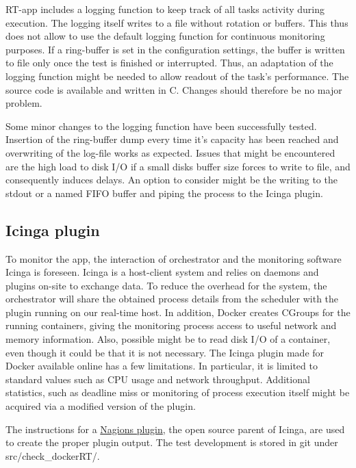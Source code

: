 \documentclass[]{scrartcl}
\begin{document}
RT-app includes a logging function to keep track of all tasks activity during execution. The logging itself writes to a file without rotation or buffers.
This thus does not allow to use the default logging function for continuous monitoring purposes.
If a ring-buffer is set in the configuration settings, the buffer is written to file only once the test is finished or interrupted. 
Thus, an adaptation of the logging function might be needed to allow readout of the task's performance.
The source code is available and written in C. Changes should therefore be no major problem.

Some minor changes to the logging function have been successfully tested. Insertion of the ring-buffer dump every time it's capacity has been reached and overwriting of the log-file works as expected.
Issues that might be encountered are the high load to disk I/O if a small disks buffer size forces to write to file, and consequently induces delays.
%
An option to consider might be the writing to the stdout or a named FIFO buffer and piping the process to the Icinga plugin. 

\subsection{Icinga plugin}

To monitor the app, the interaction of orchestrator and the monitoring software Icinga is foreseen.
Icinga is a host-client system and relies on daemons and plugins on-site to exchange data. 
To reduce the overhead for the system, the orchestrator will share the obtained process details from the scheduler with the plugin running on our real-time host.
In addition, Docker creates CGroups for the running containers, giving the monitoring process access to useful network and memory information.
Also, possible might be to read disk I/O of a container, even though it could be that it is not necessary. 
The Icinga plugin made for Docker available online has a few limitations. In particular, it is limited to standard values such as CPU usage and network throughput.
Additional statistics, such as deadline miss or monitoring of process execution itself might be acquired via a modified version of the plugin. 

%

%
The instructions for a \href{{https://nagios-plugins.org/doc/guidelines.html#DEVREQUIREMENTS}}{Nagions plugin}, the open source parent of Icinga, are used to create the proper plugin output.
The test development is stored in git under {src/check\_dockerRT/}.
\end{document}

